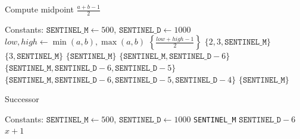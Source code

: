 \begin{algorithm}
\caption{Compute midpoint \( \frac{a + b -1}{2} \)}
\label{alg:midpoint}
\begin{algorithmic}[1]
\Require Constants: $\texttt{SENTINEL\_M} \gets 500$, $\texttt{SENTINEL\_D} \gets 1000$
    \State $low, high \gets \min(a, b), \max(a, b)$
        \State \Return $\left\{ \frac{low + high - 1}{2} \right\}$
            \State \Return $\{2, 3, \texttt{SENTINEL\_M}\}$
            \State \Return $\{3, \texttt{SENTINEL\_M}\}$
        \EndIf
            \State \Return $\{\texttt{SENTINEL\_M}\}$
            \State \Return $\{\texttt{SENTINEL\_M}, \texttt{SENTINEL\_D} - 6\}$
            \State \Return $\{\texttt{SENTINEL\_M}, \texttt{SENTINEL\_D} - 6, \texttt{SENTINEL\_D} - 5\}$
            \State \Return $\{\texttt{SENTINEL\_M}, \texttt{SENTINEL\_D} - 6, \texttt{SENTINEL\_D} - 5, \texttt{SENTINEL\_D} - 4\}$
        \EndIf
    \EndIf
    \State \Return $\{\texttt{SENTINEL\_M}\}$
\EndFunction
\end{algorithmic}
\end{algorithm}

\begin{algorithm}
\caption{Successor}
\label{alg:succ}
\begin{algorithmic}[1]
\Require Constants: $\texttt{SENTINEL\_M} \gets 500$, $\texttt{SENTINEL\_D} \gets 1000$
    \State \Return \texttt{SENTINEL\_M}
    \State \Return $\texttt{SENTINEL\_D} - 6$
\Else
    \State \Return $x + 1$
\EndIf
\EndFunction
\end{algorithmic}
\end{algorithm}


